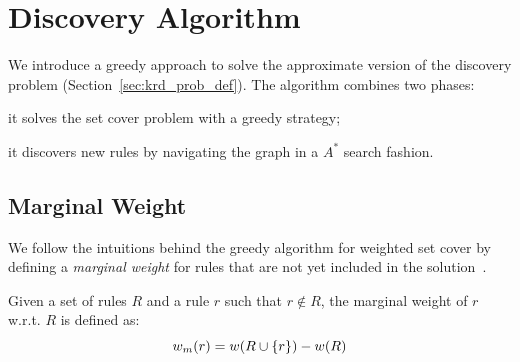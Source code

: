 \section{Discovery Algorithm} \label{sec:krd_greedy}
We introduce a greedy approach to solve the approximate version of the discovery problem (Section~\ref{sec:krd_prob_def}). The algorithm combines two phases:
\begin{inparaenum}[\itshape(i)]
	\item it solves the set cover problem with a greedy strategy;
	\item it discovers new rules by navigating the graph in a $A^*$ search fashion.
\end{inparaenum}

\subsection{Marginal Weight}
We follow the intuitions behind the greedy algorithm for weighted set cover by defining a \emph{marginal weight} for rules that are not yet included in the solution~\cite{chvatal1979greedy}.

\begin{definition}
	Given a set of rules $R$ and a rule $r$ such that $r \notin R$, the marginal weight of $r$ w.r.t. $R$ is defined as:
	\begin{equation*} \label{eq:mar_weight}
	w_m(r) = w(R \cup \{r\}) - w(R) 
		\vspace{-0.5ex}
	\end{equation*}
\end{definition}

